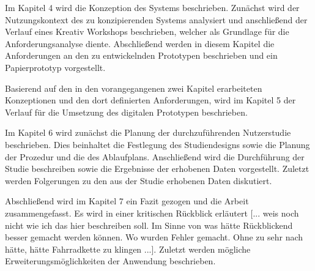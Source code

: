 Im Kapitel 4 wird die Konzeption des Systems beschrieben. Zunächst wird der Nutzungskontext des zu konzipierenden Systems analysiert und 
anschließend der Verlauf eines Kreativ Workshops beschrieben, welcher als Grundlage für die Anforderungsanalyse diente. Abschließend werden in diesem Kapitel 
die Anforderungen an den zu entwickelnden Prototypen beschrieben und ein Papierprototyp vorgestellt. 

Basierend auf den in den vorangegangenen zwei Kapitel erarbeiteten Konzeptionen und den dort definierten Anforderungen, wird im Kapitel 5 der Verlauf für die 
Umsetzung des digitalen Prototypen beschrieben.      

Im Kapitel 6 wird zunächst die Planung der durchzuführenden Nutzerstudie beschrieben. Dies beinhaltet die Festlegung des Studiendesigns sowie die Planung der Prozedur und die des Ablaufplans. 
Anschließend wird die Durchführung der Studie beschreiben sowie die Ergebnisse der erhobenen Daten vorgestellt. Zuletzt werden Folgerungen zu den aus der Studie erhobenen Daten diskutiert.

Abschließend wird im Kapitel 7 ein Fazit gezogen und die Arbeit zusammengefasst. Es wird in einer kritischen Rückblick erläutert [... weis noch nicht wie ich das hier beschreiben soll. Im Sinne
von was hätte Rückblickend besser gemacht werden können. Wo wurden Fehler gemacht. Ohne zu sehr nach hätte, hätte Fahrradkette zu klingen ...]. 
Zuletzt werden mögliche Erweiterungsmöglichkeiten der Anwendung beschrieben. 